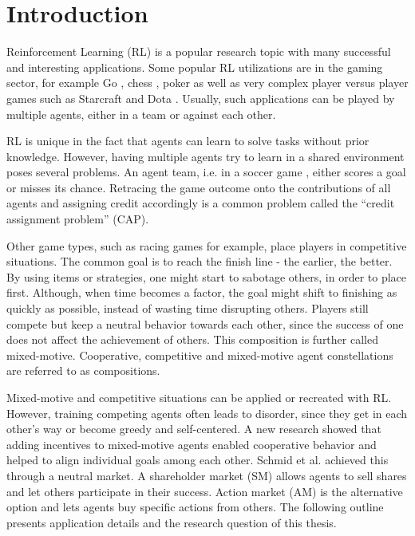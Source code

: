 \chapter{Introduction}\label{sec:Introduction}

Reinforcement Learning (RL) is a popular research topic with many successful and interesting applications. Some popular RL utilizations are in the gaming sector, for example Go \cite{sihu16}\cite{sisc17}, chess \cite{batr01}\cite{sihu17}, poker \cite{da01}\cite{xuch21} as well as very complex player versus player games such as Starcraft \cite{viba19} and Dota \cite{bebr19}. Usually, such applications can be played by multiple agents, either in a team or against each other. 

RL is unique in the fact that agents can learn to solve tasks without prior knowledge. However, having multiple agents try to learn in a shared environment poses several problems. An agent team, i.e. in a soccer game \cite{agtu04}, either scores a goal or misses its chance. Retracing the game outcome onto the contributions of all agents and assigning credit accordingly is a common problem called the ``credit assignment problem'' (CAP). 

Other game types, such as racing games for example, place players in competitive situations. The common goal is to reach the finish line - the earlier, the better. By using items or strategies, one might start to sabotage others, in order to place first. Although, when time becomes a factor, the goal might shift to finishing as quickly as possible, instead of wasting time disrupting others. Players still compete but keep a neutral behavior towards each other, since the success of one does not affect the achievement of others. This composition is further called mixed-motive. Cooperative, competitive and mixed-motive agent constellations are referred to as compositions.

Mixed-motive and competitive situations can be applied or recreated with RL. However, training competing agents often leads to disorder, since they get in each other's way or become greedy and self-centered. A new research showed that adding incentives to mixed-motive agents enabled cooperative behavior and helped to align individual goals among each other. Schmid et al. \cite{scbe21} achieved this through a neutral market. A shareholder market (SM) allows agents to sell shares and let others participate in their success. Action market (AM) is the alternative option and lets agents buy specific actions from others. The following outline presents application details and the research question of this thesis. 

